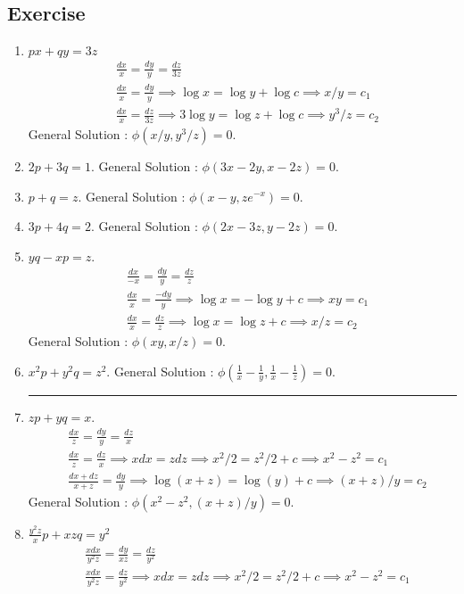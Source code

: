 \subsection{Exercise}
\begin{enumerate}
	\item $px + qy = 3z$
	\begin{align*}
		& \frac{dx}{x} = \frac{dy}{y} = \frac{dz}{3z}\\
		& \frac{dx}{x} = \frac{dy}{y} \implies \log x = \log y + \log c \implies x/y = c_1 \\
		& \frac{dx}{x} = \frac{dz}{3z} \implies 3\log y = \log z + \log c \implies y^3/z = c_2
	\end{align*}
		General Solution : $\phi(x/y,y^3/z) = 0$.
	\item $2p + 3q = 1$.
		General Solution : $\phi(3x-2y,x-2z) = 0$.
	\item $p+q = z$.
		General Solution : $\phi(x-y,ze^{-x}) = 0$.
	\item $3p+4q = 2$.
		General Solution : $\phi(2x-3z,y-2z) = 0$.
	\item $yq - xp = z$.
		\begin{align*}
			& \frac{dx}{-x} = \frac{dy}{y} = \frac{dz}{z} \\
			& \frac{dx}{x} = \frac{-dy}{y} \implies \log x = -\log y + c \implies xy = c_1 \\
			& \frac{dx}{x} = \frac{dz}{z} \implies \log x = \log z + c \implies x/z = c_2
		\end{align*}
		General Solution : $\phi(xy,x/z) = 0$.
	\item $x^2p + y^2q = z^2$.
		General Solution : $\phi(\frac{1}{x}-\frac{1}{y},\frac{1}{x}-\frac{1}{z}) = 0$.
		\hrule
	\item $zp + yq = x$.
	\begin{align*}
		& \frac{dx}{z} = \frac{dy}{y} = \frac{dz}{x} \\
		& \frac{dx}{z} = \frac{dz}{x} \implies xdx = zdz \implies x^2/2 = z^2/2 +c \implies x^2-z^2 = c_1\\
		& \frac{dx+dz}{x+z} = \frac{dy}{y} \implies \log(x+z) = \log(y)+c \implies (x+z)/y = c_2
	\end{align*}
		General Solution : $\phi(x^2-z^2,(x+z)/y) = 0$.
	\item $\frac{y^2z}{x}p + xzq = y^2$
		\begin{align*}
			& \frac{xdx}{y^2z} = \frac{dy}{xz} = \frac{dz}{y^2} \\
			& \frac{xdx}{y^2z} = \frac{dz}{y^2} \implies xdx = zdz \implies x^2/2 = z^2/2 + c \implies x^2-z^2 = c_1 \\

\end{align*}
\end{enumerate}

